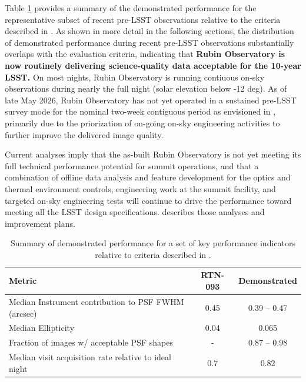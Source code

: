 \documentclass[OPS,lsst,authoryear,toc]{lsstdoc}
\begin{document}
Table \ref{tab:metrics} provides a summary of the demonstrated performance for the representative subset of recent pre-LSST observations relative to the criteria described in \cite{RTN-093}.
As shown in more detail in the following sections, the distribution of demonstrated performance during recent pre-LSST observations substantially overlaps with the evaluation criteria, indicating that \textbf{Rubin Observatory is now routinely delivering science-quality data acceptable for the 10-year LSST.}
On most nights, Rubin Observatory is running contiuous on-sky observations during nearly the full night (solar elevation below -12 deg).
As of late May 2026, Rubin Observatory has not yet operated in a sustained pre-LSST survey mode for the nominal two-week contiguous period as envisioned in \cite{RTN-093}, primarily due to the priorization of on-going on-sky engineering activities to further improve the delivered image quality.

Current analyses imply that the as-built Rubin Observatory is not yet meeting its full technical performance potential for summit operations, and that a combination of offline data analysis and feature development for the optics and thermal environment controls, engineering work at the summit facility, and targeted on-sky engineering tests will continue to drive the performance toward meeting all the LSST design specifications.
\cite{SOTN-004} describes those analyses and improvement plans.

\begin{table}
\centering
\caption{Summary of demonstrated performance for a set of key performance indicators relative to criteria described in \cite{RTN-093}.}
\label{tab:metrics}
\begin{tabular}{lcc}
\hline
\textbf{Metric} &  \textbf{RTN-093} & \textbf{Demonstrated} \\
\hline
Median Instrument contribution to PSF FWHM (arcsec) & 0.45 & 0.39 -- 0.47 \\
Median Ellipticity & 0.04 & 0.065 \\
Fraction of images w/ acceptable PSF shapes & - & 0.87 -- 0.98 \\
Median visit acquisition rate relative to ideal night & 0.7 & 0.82 \\
\hline
\end{tabular}
\end{table}
\end{document}
